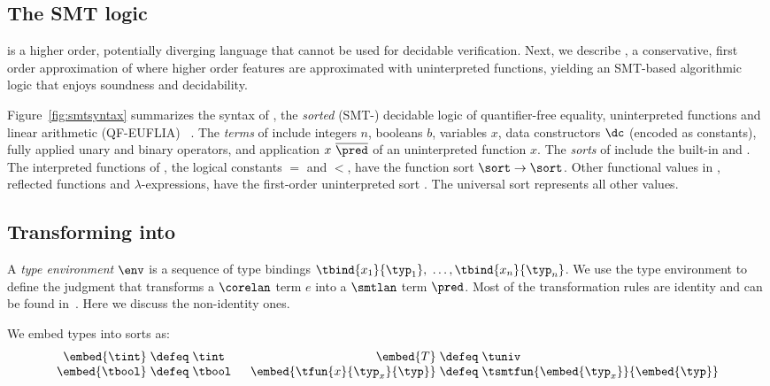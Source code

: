 \subsection{The SMT logic \smtlan}
\corelan is a higher order, potentially diverging language
that cannot be used for decidable verification.
%
Next, we describe \smtlan, a conservative, first order
approximation of \corelan where higher order features are
approximated with uninterpreted functions,
yielding an SMT-based
algorithmic logic that enjoys soundness and decidability.



%
Figure~\ref{fig:smtsyntax} summarizes the syntax
of \smtlan, the \emph{sorted} (SMT-)
decidable logic of quantifier-free equality,
uninterpreted functions and linear
arithmetic (QF-EUFLIA) ~\citep{Nelson81,SMTLIB2}.
%
The \emph{terms} of \smtlan include
integers $n$,
booleans $b$,
variables $x$,
data constructors $\dc$ (encoded as constants),
fully applied unary \unop and binary \binop operators,
and application $x\ \overline{\pred}$ of an uninterpreted function $x$.
%
The \emph{sorts} of \smtlan include the built-in
\tint and \tbool.
%
The interpreted functions of \smtlan, \eg
the logical constants $=$ and $<$,
have the function sort $\sort \rightarrow \sort$.
%
Other functional values in \corelan, \eg
reflected \corelan functions and
$\lambda$-expressions, have the first-order
uninterpreted sort \tsmtfun{\sort}{\sort}.
%
The universal sort \tuniv represents all other values.

\subsection{Transforming \corelan into \smtlan}
%
\label{subsec:embedding}

%
%
A \emph{type environment} $\env$ is a sequence of type bindings
$\tbind{x_1}{\typ_1},$ $\ldots,\tbind{x_n}{\typ_n}$.
We use the type environment to define the judgment
that transforms a $\corelan$ term $e$
into a $\smtlan$ term $\pred$.
%
Most of the transformation rules are identity
and can be found in~\cite{appendix}.
Here we discuss the non-identity ones.

%
We embed \corelan types into \smtlan sorts as:
%
\[\arraycolsep=1.4pt
\begin{array}{rclcrcl}
\embed{\tint}                       & \defeq &  \tint & \quad &
\embed{T}                           & \defeq &  \tuniv \\
\embed{\tbool}                      & \defeq &  \tbool & \quad &
\embed{\tfun{x}{\typ_x}{\typ}} & \defeq & \tsmtfun{\embed{\typ_x}}{\embed{\typ}}
\end{array}
\]


